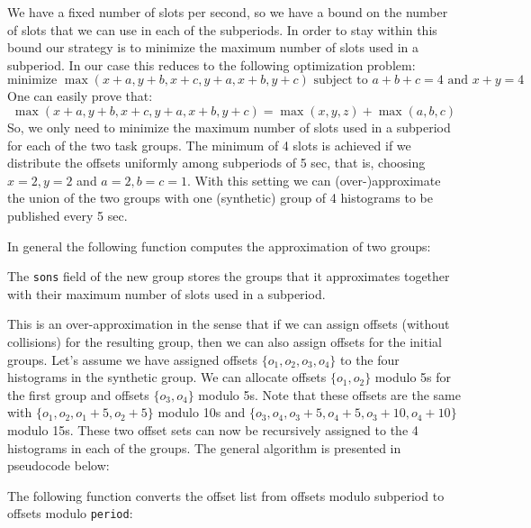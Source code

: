 We have a fixed number of slots per second, so we have a bound on the number of slots that we can use in each of the subperiods. In order to stay within this bound our strategy is to minimize the maximum number of slots used in a subperiod. In our case this reduces to the following optimization problem:
$$ \text{minimize } \max(x+a, y+b, x+c, y+a, x+b, y+c) \text{ subject to } a+b+c=4 \text{ and } x+y = 4 $$
One can easily prove that:
$$ \max(x+a, y+b, x+c, y+a, x+b, y+c) = \max(x, y, z) + \max(a, b, c)$$
So, we only need to minimize the maximum number of slots used in a subperiod for each of the two task groups. The minimum of 4 slots is achieved if we distribute the offsets uniformly among subperiods of 5 sec, that is, choosing $x=2, y=2$ and $a=2, b=c=1$. With this setting we can (over-)approximate the union of the two groups with one (synthetic) group of 4 histograms to be published every 5 sec.

In general the following function computes the approximation of two groups:

The \verb+sons+ field of the new group stores the groups that it approximates together with their maximum number of slots used in a subperiod.

This is an over-approximation in the sense that if we can assign offsets (without collisions) for the resulting group, then we can also assign offsets for the initial groups. Let's assume we have assigned offsets $\{o_1,o_2,o_3,o_4\}$ to the four histograms in the synthetic group. We can allocate offsets $\{o_1, o_2\}$ modulo 5s for the first group and offsets $\{o_3, o_4\}$ modulo 5s. Note that these offsets are the same with $\{o_1, o_2, o_1 + 5, o_2 + 5\}$ modulo 10s and $\{o_3, o_4, o_3 + 5, o_4 + 5, o_3 + 10, o_4 + 10\}$ modulo 15s. These two offset sets can now be recursively assigned to the 4 histograms in each of the groups. The general algorithm is presented in pseudocode below:

The following function converts the offset list from offsets modulo subperiod to offsets modulo \verb+period+:



